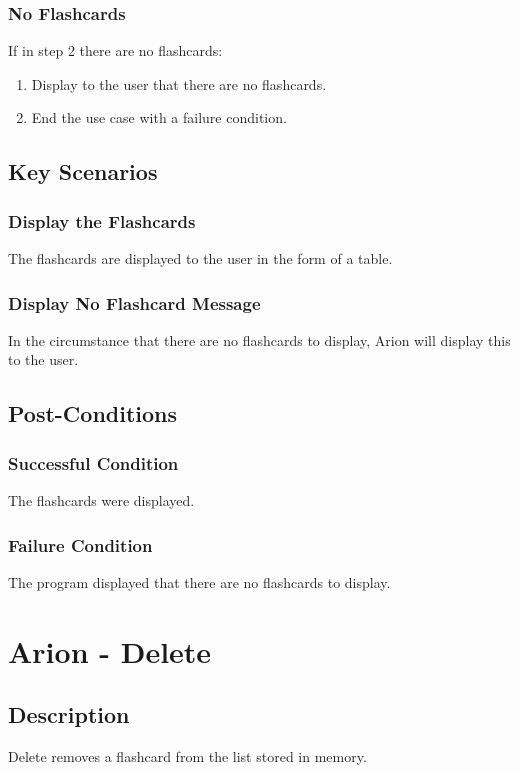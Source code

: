 \documentclass{scrreprt}
\begin{document}
    \subsection{No Flashcards}
    If in step 2 there are no flashcards:
    \begin{enumerate}
        \item Display to the user that there are no flashcards.
        \item End the use case with a failure condition.
    \end{enumerate}

\section{Key Scenarios}
    \subsection{Display the Flashcards}
    The flashcards are displayed to the user in the form of a table.

    \subsection{Display No Flashcard Message}
    In the circumstance that there are no flashcards to display, Arion will
    display this to the user.

\section{Post-Conditions}
    \subsection{Successful Condition}
    The flashcards were displayed.
    
    \subsection{Failure Condition}
    The program displayed that there are no flashcards to display.


\chapter{Arion - Delete}

\section{Description}
Delete removes a flashcard from the list stored in memory.
\end{document}
